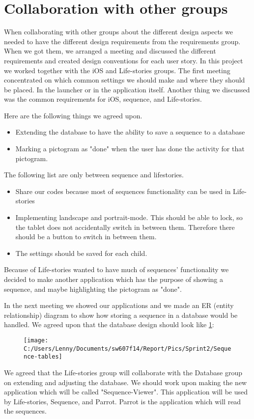 \section{Collaboration with other groups}
When collaborating with other groups about the different design aspects we needed to have the different design requirements from the requirements group.
When we got them, we arranged a meeting and discussed the different requirements and created design conventions for each user story.
In this project we worked together with the iOS and Life-stories groups.
The first meeting concentrated on which common settings we should make and where they should be placed. In the launcher or in the application itself. 
Another thing we discussed was the common requirements for iOS, sequence, and Life-stories. 

Here are the following things we agreed upon.
\begin{itemize}
\item Extending the database to have the ability to save a sequence to a database
\item Marking a pictogram as "done" when the user has done the activity for that pictogram.
\end{itemize}

The following list are only between sequence and lifestories. 
\begin{itemize}
\item Share our codes because most of sequences functionality can be used in Life-stories
\item Implementing landscape and portrait-mode. This should be able to lock, so the tablet does not accidentally switch in between them. Therefore there should be a button to switch in between them.
\item The settings should be saved for each child.
\end{itemize}

Because of Life-stories wanted to have much of sequences' functionality we decided to make another application which has the purpose of showing a sequence, and maybe highlighting the pictogram as "done".

In the next meeting we showed our applications and we made an ER (entity relationship) diagram to show how storing a sequence in a database would be handled.
We agreed upon that the database design should look like \ref{fig:Sequence-tables}:
\begin{figure}
\centering
\texttt{[image: C:/Users/Lenny/Documents/sw607f14/Report/Pics/Sprint2/Sequence-tables]}
\caption[An ER diagram that should be included into the overall database]{}
\caption{}
\label{fig:Sequence-tables}
\end{figure}
We agreed that the Life-stories group will collaborate with the Database group on extending and adjusting the database.
We should work upon making the new application which will be called "Sequence-Viewer". This application will be used by Life-stories, Sequence, and Parrot. Parrot is the application which will read the sequences. 